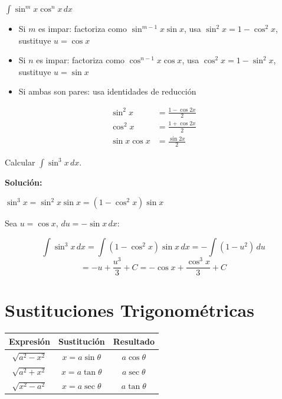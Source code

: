 \documentclass[12pt, a4paper]{book}
\begin{document}
\begin{caso}
$\int \sin^m x \cos^n x \, dx$

\begin{itemize}
    \item Si $m$ es impar: factoriza como $\sin^{m-1}x \sin x$, usa $\sin^2 x = 1 - \cos^2 x$, sustituye $u = \cos x$
    \item Si $n$ es impar: factoriza como $\cos^{n-1}x \cos x$, usa $\cos^2 x = 1 - \sin^2 x$, sustituye $u = \sin x$
    \item Si ambas son pares: usa identidades de reducción
\end{itemize}
\end{caso}

\begin{identidades}
\begin{align}
\sin^2 x &= \frac{1 - \cos 2x}{2} \\
\cos^2 x &= \frac{1 + \cos 2x}{2} \\
\sin x \cos x &= \frac{\sin 2x}{2}
\end{align}
\end{identidades}

\begin{ejemplo}
Calcular $\int \sin^3 x \, dx$.

\textbf{Solución:}

$\sin^3 x = \sin^2 x \sin x = (1 - \cos^2 x) \sin x$

Sea $u = \cos x$, $du = -\sin x \, dx$:

\[
\int \sin^3 x \, dx = \int (1 - \cos^2 x) \sin x \, dx = -\int (1 - u^2) \, du
\]
\[
= -u + \frac{u^3}{3} + C = -\cos x + \frac{\cos^3 x}{3} + C
\]
\end{ejemplo}

\section{Sustituciones Trigonométricas}

\begin{tabla}[h]
\centering
\begin{tabular}{|c|c|c|}
\hline
\textbf{Expresión} & \textbf{Sustitución} & \textbf{Resultado} \\
\hline
$\sqrt{a^2 - x^2}$ & $x = a\sin\theta$ & $a\cos\theta$ \\
$\sqrt{a^2 + x^2}$ & $x = a\tan\theta$ & $a\sec\theta$ \\
$\sqrt{x^2 - a^2}$ & $x = a\sec\theta$ & $a\tan\theta$ \\
\hline
\end{tabular}
\end{tabla}
\end{document}
